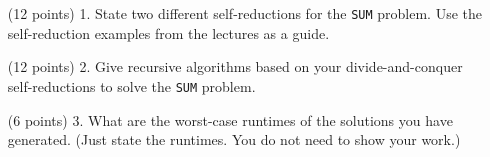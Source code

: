 \documentclass[paper=a4,fontsize=11pt]{article}
\begin{document}
\begin{enumerate}
\item [(12 points) 1.] State two different self-reductions for the \texttt{SUM} problem. Use the self-reduction examples from the lectures as a guide.

\item [(12 points) 2.] Give recursive algorithms based on your divide-and-conquer self-reductions to solve the \texttt{SUM} problem.

\item [(6 points) 3.] What are the worst-case runtimes of the solutions you have generated. (Just state the runtimes. You do not need to show your work.)

\end{enumerate}
\end{document}
